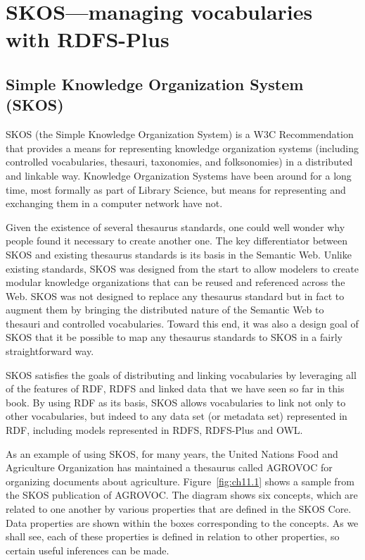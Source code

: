 \chapter{SKOS---managing vocabularies with RDFS-Plus}
\label{ch11}



\section{Simple Knowledge Organization System (SKOS)}
\label{ch11.skos}
SKOS (the Simple Knowledge Organization System) is a W3C Recommendation \cite{Miles:09:SSK}
that provides a means for representing knowledge organization systems
(including controlled vocabularies, thesauri, taxonomies, and
folksonomies) in a distributed and linkable way. Knowledge Organization
Systems have been around for a long time, most formally as part of
Library Science, but means for representing and exchanging them in a
computer network have not.

Given the existence of several thesaurus standards, one could well
wonder why people found it necessary to create another one. The key
differentiator between SKOS and existing thesaurus standards is its
basis in the Semantic Web. Unlike existing standards, SKOS was designed
from the start to allow modelers to create modular knowledge
organizations that can be reused and referenced across the Web. SKOS was
not designed to replace any thesaurus standard but in fact to augment
them by bringing the distributed nature of the Semantic Web to thesauri
and controlled vocabularies. Toward this end, it was also a design goal
of SKOS that it be possible to map any thesaurus standards to SKOS in a
fairly straightforward way.

SKOS satisfies the goals of distributing and linking vocabularies by leveraging
all of the features of RDF, RDFS and linked data that we have seen so far in this book. 
By using RDF as its basis, SKOS allows vocabularies to link not only to other vocabularies, but 
indeed to any data set (or metadata set) represented in RDF, including 
models represented in RDFS, RDFS-Plus and OWL. 

As an example of using SKOS, for many years, the United Nations Food and
Agriculture Organization has maintained a thesaurus called AGROVOC \cite{caracciolo2013agrovoc} for
organizing documents about agriculture. Figure~\ref{fig:ch11.1} shows a sample from
the SKOS publication of AGROVOC. The diagram shows six concepts, which
are related to one another by various properties that are defined in the
SKOS Core. Data properties are shown within the boxes corresponding to
the concepts. As we shall see, each of these properties is defined in
relation to other properties, so certain useful inferences can be made.

